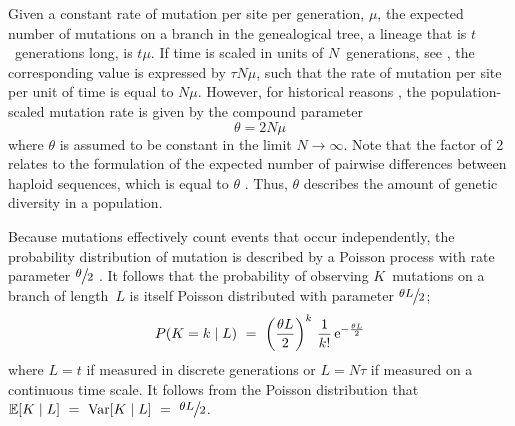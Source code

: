 Given a constant rate of mutation per site per generation, $\mu$, the expected number of mutations on a branch in the genealogical tree, \ie a lineage that is $t$~generations long, is ${t\mu}$.
If time is scaled in units of $N$~generations, see , the corresponding value is expressed by ${\tau N \mu}$, such that the rate of mutation per site per unit of time is equal to ${N \mu}$.
However, for historical reasons \citep[\eg, see][]{wakeley2008}, the population-scaled mutation rate is given by the compound parameter
\begin{equation}\label{eq:mutrate}
	\theta = 2 N \mu
\end{equation}
where $\theta$ is assumed to be constant in the limit ${N\rightarrow\infty}$.
Note that the factor of 2 relates to the formulation of the expected number of pairwise differences between  haploid sequences, which is equal to $\theta$ \citep{tajima1993}.
Thus, $\theta$ describes the amount of genetic diversity in a population.

Because mutations effectively count events that occur independently, the probability distribution of mutation is described by a Poisson process with rate parameter ${\large \sfrac{\theta}{2}}$ \citep{wakeley2008}.
It follows that the probability of observing $K$~mutations on a branch of length~$L$ is itself Poisson distributed with parameter ${\large \sfrac{\theta L}{2}}$;
\begin{equation}
	P(K = k \mid L) ~=~ \bigg( \frac{\theta L}{2} \bigg)^k ~ \frac{1}{k!} \,\mathrm{e}^{-\frac{\theta L}{2}}
\end{equation}
where ${L=t}$ if measured in discrete generations or ${L=N\tau}$ if measured on a continuous time scale.
It follows from the Poisson distribution that ${\mathbb{E}[K \mid L] ~=~ \operatorname{Var}[K \mid L] ~=~ \large \sfrac{\theta L}{2}}$.

